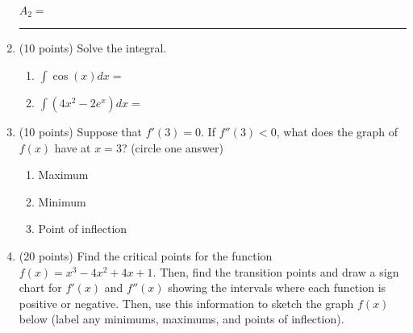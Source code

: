 \documentclass[11pt]{article}
\begin{document}
\begin{enumerate}
\vspace{20pt}
\begin{flushright}
$A_2 = $ \rule{2cm}{0.4pt}
\end{flushright}


\item (10 points) Solve the integral.
\begin{enumerate}[itemsep=25pt]
    \item $\int \cos(x)dx = $ \\
    \item $\int (4x^2 - 2e^x)dx  =$ \\
\end{enumerate}

\vspace{10 mm}

\item (10 points) Suppose that $f'(3)=0$.  If $f''(3) < 0$, what does the graph of $f(x)$ have at $x=3$? (circle one answer)
\begin{enumerate}
    \item Maximum
    \item Minimum
    \item Point of inflection
\end{enumerate}


\newpage

\item (20 points) Find the critical points for the function $f(x) = x^3 - 4x^2 +4x+1$. Then, find the transition points and draw a sign chart for $f'(x)$ and $f''(x)$ showing the intervals where each function is positive or negative. Then, use this information to sketch the graph $f(x)$ below (label any minimums, maximums, and points of inflection).
\\

\vspace{60 mm}

\vspace{10pt}
\begin{center}
\end{center}


\end{enumerate}
\end{document}
